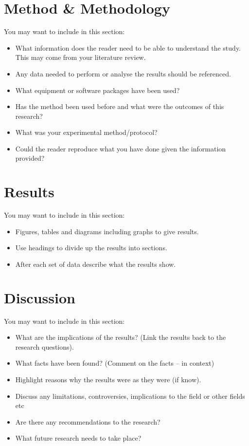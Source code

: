 \documentclass{bcrre_assignment}
\begin{document}
\section{Method \& Methodology}
You may want to include in this section:
\begin{itemize}
    \item What information does the reader need to be able to understand the study. This may come from your literature review. 
    \item Any data needed to perform or analyse the results should be referenced.
    \item What equipment or software packages have been used?
    \item Has the method been used before and what were the outcomes of this research?
    \item What was your experimental method/protocol?
    \item Could the reader reproduce what you have done given the information provided?
\end{itemize}


\section{Results}
You may want to include in this section:
\begin{itemize}
    \item Figures, tables and diagrams including graphs to give results.
    \item Use headings to divide up the results into sections.
    \item After each set of data describe what the results show.
\end{itemize}

\section{Discussion}
You may want to include in this section:
\begin{itemize}
    \item What are the implications of the results? (Link the results back to the research questions).
    \item What facts have been found? (Comment on the facts – in context)
    \item Highlight reasons why the results were as they were (if know).
    \item Discuss any limitations, controversies, implications to the field or other fields etc
    \item Are there any recommendations to the research?
    \item What future research needs to take place?
\end{itemize}
\end{document}
